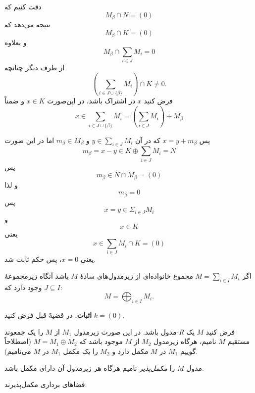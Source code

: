 \begin{frame}
    دقت کنیم که
    $$M_\beta \cap N =(0)$$
    نتیجه می‌دهد که
    $$M_\beta \cap K =(0)$$
    و بعلاوه
    $$M_\beta \cap \sum_{i \in J} M_i = 0$$
    از طرف دیگر چنانچه
    \[
        \left(\sum_{i \in J \cup \{\beta\}} M_i\right) \cap K \neq 0.
    \]
    فرض کنید $x$ در اشتراک باشد،
    در این‌صورت
    $x\in K$
    و ضمناً
    \[
        x \in \sum_{i \in J \cup \{\beta\}} M_i = \left(\sum_{i \in J} M_i\right)  + M_\beta
    \]


\end{frame}
\begin{frame}
    پس
    $x = y + m_\beta$
    که در آن
    \(y \in \sum_{i \in J} M_i\)
    و
    \(m_\beta \in M_\beta\)
    اما در این صورت
    \[
        m_\beta = x - y \in K \oplus \sum_{i \in J} M_i = N
    \]
    پس
    \[
        m_\beta \in  N \cap M_\beta  = (0)
    \]
    و لذا
    \[
        m_\beta = 0
    \]
    پس
    \[
        x=y \in \Sigma_{i\in J} M_i
    \]
    و
    \[
        x \in K
    \]
    یعنی
    \[
        x \in  \sum_{i \in J} M_i \cap K  = (0)
    \]
    یعنی
    \(x = 0\)،
    پس حکم ثابت شد.

\end{frame}
\begin{frame}
    \begin{corollary}
        اگر $M = \sum_{i \in I} M_i$ مجموع خانواده‌ای از زیرمدول‌های سادهٔ $M$ باشد آنگاه
        زیرمجموعهٔ
        $J \subseteq I$ وجود دارد که:
        \[
            M = \bigoplus_{i \in I} M_i.
        \]


    \end{corollary}


    \textbf{اثبات.}
    در قضیهً قبل
    فرض کنید
    \( k = (0) \).


\end{frame}

\begin{frame}
    \begin{definition}
        فرض کنید \( M \) یک \( R \)-مدول باشد.
        در این صورت زیرمدول
        \( M_1 \)
        از
        \( M \)
        را یک جمعوند مستقیم
        \( M \)
        نامیم، هرگاه زیرمدول
        \( M_2 \)
        از
        \( M \)
        موجود باشد که
        \( M = M_1 \oplus M_2 \)
        (اصطلاحاً گوییم \( M_1 \) در \( M \) مکمل دارد و \( M_2 \) را یک مکمل \( M_1 \) در \( M \) می‌نامیم).



    \end{definition}

    \begin{definition}
        مدول \( M \) را \textit{مکمل‌پذیر} نامیم هرگاه هر زیرمدول آن دارای مکمل باشد.

    \end{definition}

    \begin{example}
        فضاهای برداری مکمل‌پذیرند.

    \end{example}

\end{frame}

